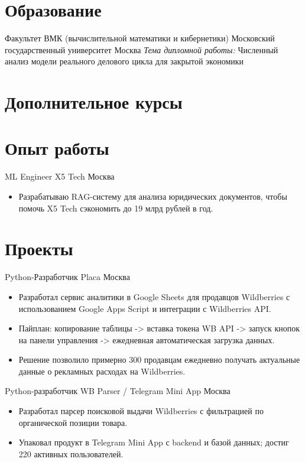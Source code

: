 \documentclass[11pt,a4paper,sans]{moderncv}
\begin{document}
\makecvtitle

\section{Образование}
{Факультет ВМК (вычислительной математики и кибернетики)}
{Московский государственный университет}
{Москва}{}{
\vspace{2pt}
\normalsize \textit{Тема дипломной работы:} Численный анализ модели реального делового цикла для закрытой экономики
}

\section{Дополнительное курсы}

\section{Опыт работы}
{ML Engineer}
{X5 Tech}
{Москва}{}{
\begin{itemize}
    \item Разрабатываю RAG-систему для анализа юридических документов, чтобы помочь X5 Tech сэкономить до 19 млрд рублей в год. 
\end{itemize}
}

\section{Проекты}
{Python-Разработчик}
{Placa}
{Москва}{}{
\begin{itemize}
    \item Разработал сервис аналитики в Google Sheets для продавцов Wildberries с использованием Google Apps Script и интеграции с Wildberries API.
    \item Пайплан: копирование таблицы -> вставка токена WB API -> запуск кнопок на панели управления -> ежедневная автоматическая загрузка данных.
    \item Решение позволило примерно 300 продавцам ежедневно получать актуальные данные о рекламных расходах на Wildberries.
\end{itemize}
}

{Python-разработчик}
{WB Parser / Telegram Mini App}
{Москва}{}{
\vspace{3pt}
\begin{itemize}
    \item Разработал парсер поисковой выдачи Wildberries с фильтрацией по органической позиции товара.
    \item Упаковал продукт в Telegram Mini App с backend и базой данных; достиг 220 активных пользователей.
\end{itemize}
}
\end{document}
